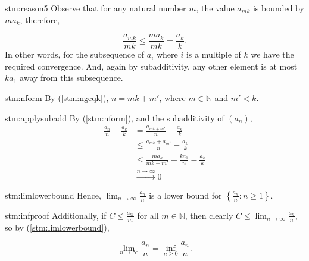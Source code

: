 \begin{explanation}{stm:reason5}
Observe that for any natural number $m$, the value $a_{mk}$ is bounded by $m a_k$, therefore,

\[
\frac{a_{mk}}{mk} \le \frac{ma_k}{mk} = \frac{a_k}{k}.
\]
In other words, for the subsequence of $a_i$ where $i$ is a multiple of $k$ we have the required convergence. And, again by subadditivity, any other element is at most $k a_1$ away from this subsequence.
\end{explanation}

\begin{statement}{stm:nform}
By (\ref{stm:ngeqk}), $n = mk + m'$, where $m \in \mathbb{N}$ and $m' < k$.
\end{statement}

\begin{statement}{stm:applysubadd}
By (\ref{stm:nform}), and the subadditivity of $(a_n)$,
\begin{align*}
\frac{a_n}{n} - \frac{a_k}{k} &=\frac{a_{mk + m'}}{n} - \frac{a_k}{k} \\
&\le \frac{a_{mk} + a_{m'}}{n} - \frac{a_k}{k} \\
&\le \frac{ma_k}{mk + m'} + \frac{k a_1}{n} - \frac{a_k}{k} \\
&\xrightarrow{n \to \infty} 0
\end{align*}
\end{statement}

\begin{statement}{stm:limlowerbound}
Hence, $\lim_{n \to \infty} \frac{a_n}{n}$ is a lower bound for $\left\{ \frac{a_n}{n} : n \ge 1 \right\}$.
\end{statement}

\begin{statement}{stm:infproof}
Additionally, if $C \le \frac{a_m}{m}$ for all $m \in \mathbb{N}$, then clearly $C \le \lim_{n \to \infty} \frac{a_n}{n}$, so by (\ref{stm:limlowerbound}),

\[
\lim_{n \to \infty} \frac{a_n}{n} = \inf_{n \ge 0} \frac{a_n}{n}.
\]
\end{statement}
